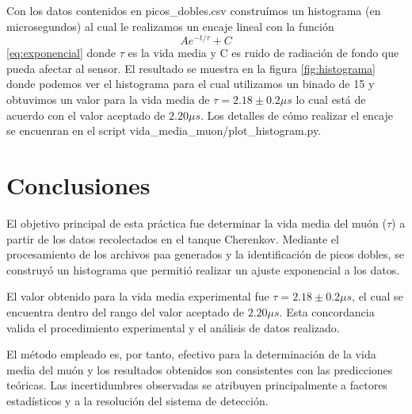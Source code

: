\documentclass[twocolumn,a4paper,11pt]{scrartcl}
\begin{document}
Con los datos contenidos en picos\_dobles.csv construímos un histograma (en microsegundos) al cual le realizamos un encaje lineal con la función $$Ae^{-t/\tau} + C$$ \ref{eq:exponencial} donde $\tau$ es la vida media y C es ruido de radiación de fondo que pueda afectar al sensor. El resultado se muestra en la figura \ref{fig:histograma} donde podemos ver el histograma para el cual utilizamos un binado de 15 y obtuvimos un valor para la vida media de $\tau =  2.18 \pm 0.2 \mu s$ lo cual está de acuerdo con el valor aceptado de $2.20 \mu s$. Los detalles de cómo realizar el encaje se encuenran en el script vida\_media\_muon/plot\_histogram.py.

\section{Conclusiones}

El objetivo principal de esta práctica fue determinar la vida media del muón ($\tau$) a partir de los datos recolectados en el tanque Cherenkov. Mediante el procesamiento de los archivos paa generados y la identificación de picos dobles, se construyó un histograma que permitió realizar un ajuste exponencial a los datos.

El valor obtenido para la vida media experimental fue $\tau = 2.18 \pm 0.2 \mu s$, el cual se encuentra dentro del rango del valor aceptado de $2.20 \mu s$.  Esta concordancia valida el procedimiento experimental y el análisis de datos realizado.

El método empleado es, por tanto, efectivo para la determinación de la vida media del muón y los resultados obtenidos son consistentes con las predicciones teóricas.  Las incertidumbres observadas se atribuyen principalmente a factores estadísticos y a la resolución del sistema de detección.


 
\end{document}
